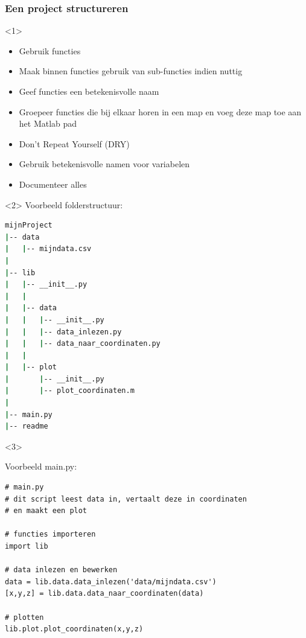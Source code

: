 \documentclass[t]{beamer}
\begin{document}
\begin{frame}[fragile]
	\frametitle{Een project structureren}
\begin{onlyenv}<1>
	\begin{itemize}
		\item Gebruik functies
		\item Maak binnen functies gebruik van sub-functies indien nuttig
		\item Geef functies een betekenisvolle naam
		\item Groepeer functies die bij elkaar horen in een map en voeg deze map toe aan het Matlab pad
		\item Don't Repeat Yourself (DRY)
		\item Gebruik betekenisvolle namen voor variabelen
		\item Documenteer alles
	\end{itemize}
\end{onlyenv}
\begin{onlyenv}<2>
Voorbeeld folderstructuur:

	\begin{lstlisting}[language=bash]
mijnProject	
|-- data
|   |-- mijndata.csv
|
|-- lib
|   |-- __init__.py
|   |
|   |-- data
|   |   |-- __init__.py
|   |   |-- data_inlezen.py
|   |   |-- data_naar_coordinaten.py
|   |
|   |-- plot
|       |-- __init__.py
|       |-- plot_coordinaten.m
|
|-- main.py
|-- readme
	\end{lstlisting}
\end{onlyenv}
\begin{onlyenv}<3>

Voorbeeld main.py:
	\begin{lstlisting}
# main.py
# dit script leest data in, vertaalt deze in coordinaten
# en maakt een plot

# functies importeren
import lib

# data inlezen en bewerken
data = lib.data.data_inlezen('data/mijndata.csv')
[x,y,z] = lib.data.data_naar_coordinaten(data)

# plotten
lib.plot.plot_coordinaten(x,y,z)
	\end{lstlisting}	
	
\end{onlyenv}
\end{frame}
\end{document}
